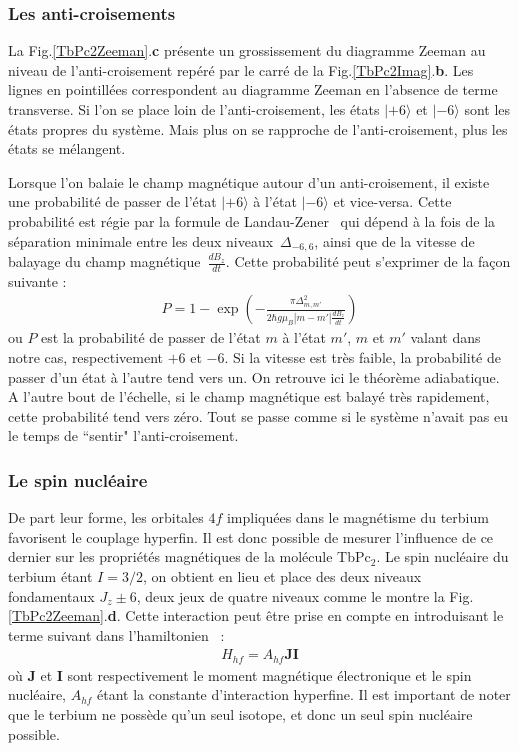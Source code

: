 \subsubsection{Les anti-croisements}
La Fig.\ref{TbPc2Zeeman}.\textbf{c} présente un grossissement du diagramme Zeeman au niveau de l'anti-croisement repéré par le carré de la Fig.\ref{TbPc2Imag}.\textbf{b}. Les lignes en pointillées correspondent au diagramme Zeeman en l'absence de terme transverse. Si l'on se place loin de l'anti-croisement, les états $|+6\rangle$ et $|-6\rangle$ sont les états propres du système. Mais plus on se rapproche de l'anti-croisement, plus les états se mélangent.

Lorsque l'on balaie le champ magnétique autour d'un anti-croisement, il existe une probabilité de passer de l'état $|+6\rangle$ à l'état $|-6\rangle$ et vice-versa. Cette probabilité est régie par la formule de Landau-Zener~\cite{Zener1932} qui dépend à la fois de la séparation minimale entre les deux niveaux~$\Delta_{-6,6}$, ainsi que de la vitesse de balayage du champ magnétique~$\frac{dB_z}{dt}$. Cette probabilité peut s'exprimer de la façon suivante :
\begin{eqnarray}
P = 1 - \exp \left( -\frac{\pi \Delta^2_{m,m'}}{2 \hbar g \mu_B |m-m'|\frac{dB_z}{dt}} \right)
\label{LandauZener}
\end{eqnarray}
ou $P$ est la probabilité de passer de l'état $m$ à l'état $m'$, $m$ et $m'$ valant dans notre cas, respectivement $+6$ et $-6$. Si la vitesse est très faible, la probabilité de passer d'un état à l'autre tend vers un. On retrouve ici le théorème adiabatique. A l'autre bout de l'échelle, si le champ magnétique est balayé très rapidement, cette probabilité tend vers zéro. Tout se passe comme si le système n'avait pas eu le temps de ``sentir" l'anti-croisement.




\subsubsection{Le spin nucléaire}
De part leur forme, les orbitales $4f$ impliquées dans le magnétisme du terbium favorisent le couplage hyperfin. Il est donc possible de mesurer l'influence de ce dernier sur les propriétés magnétiques de la molécule TbPc$_{2}$. Le spin nucléaire du terbium étant $I = 3/2$, on obtient en lieu et place des deux niveaux fondamentaux $J_z \pm 6$, deux jeux de quatre niveaux comme le montre la Fig.\ref{TbPc2Zeeman}.\textbf{d}. Cette interaction peut être prise en compte en introduisant le terme suivant dans l'hamiltonien~\cite{Bleaney1961} :
\begin{eqnarray}
H_{hf} = A_{hf}\mathbf{J}\mathbf{I}
\end{eqnarray}
où $\mathbf{J}$ et $\mathbf{I}$ sont respectivement le moment magnétique électronique et le spin nucléaire, $A_{hf}$ étant la constante d'interaction hyperfine. Il est important de noter que le terbium ne possède qu'un seul isotope, et donc un seul spin nucléaire possible.

